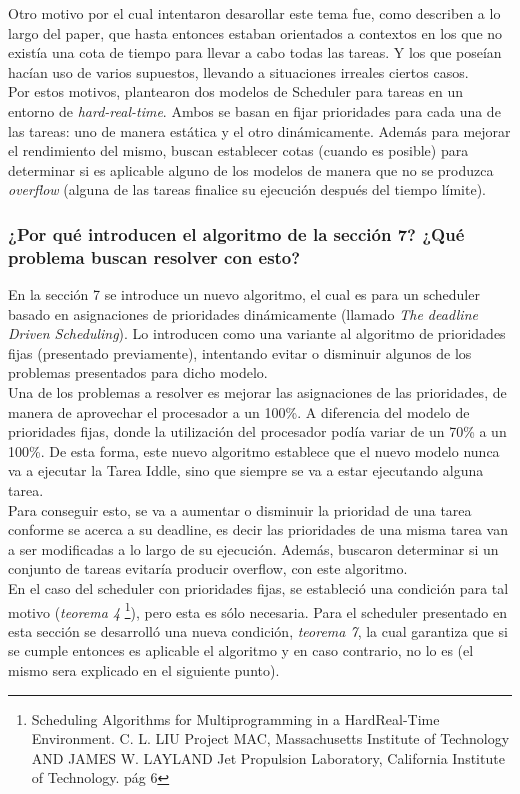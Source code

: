 \documentclass[a4paper]{article}
\begin{document}
Otro motivo por el cual intentaron desarollar este tema fue, como describen a lo largo del paper, que hasta entonces estaban orientados a contextos en los que no exist\'ia una cota de tiempo para llevar a cabo todas las tareas. Y los que pose\'ian hacían uso de varios supuestos, llevando a situaciones irreales ciertos casos. \\

Por estos motivos, plantearon dos modelos de Scheduler para tareas en un entorno de \textit{hard-real-time}. Ambos se basan en fijar prioridades para cada una de las tareas: uno de manera estática y el otro dinámicamente. Además para mejorar el rendimiento del mismo, buscan establecer cotas (cuando es posible) para determinar si es aplicable alguno de los modelos de manera que no se produzca \textit{overflow} (alguna de las tareas finalice su ejecución después del tiempo límite).


\subsubsection{¿Por qu\'e introducen el algoritmo de la secci\'on 7? ¿Qu\'e problema buscan resolver con esto?}
En la sección 7 se introduce un nuevo algoritmo, el cual es para un scheduler basado en asignaciones de prioridades dinámicamente (llamado \textit{The deadline Driven Scheduling}). Lo introducen como una variante al algoritmo de prioridades fijas (presentado previamente), intentando evitar o disminuir algunos de los problemas presentados para dicho modelo. \\

Una de los problemas a resolver es mejorar las asignaciones de las prioridades, de manera de aprovechar el procesador a un 100\%. A diferencia del modelo de prioridades fijas, donde la utilización del procesador podía variar de un 70\% a un 100\%. De esta forma, este nuevo algoritmo establece que el nuevo modelo nunca va a ejecutar la Tarea Iddle, sino que siempre se va a estar ejecutando alguna tarea. \\

 Para conseguir esto, se va a aumentar o disminuir la prioridad de una tarea conforme se acerca a su deadline, es decir las prioridades de una misma tarea van a ser modificadas a lo largo de su ejecución. Además, buscaron determinar si un conjunto de tareas evitar\'ia producir overflow, con este algoritmo.\\
 
  En el caso del scheduler con prioridades fijas, se estableció una condición para tal motivo (\textit{teorema 4} \footnote{Scheduling Algorithms for Multiprogramming in a HardReal-Time Environment.
C. L. LIU Project MAC, Massachusetts Institute of Technology AND JAMES W. LAYLAND Jet Propulsion Laboratory, California Institute of Technology. pág 6}), pero esta es s\'olo necesaria. Para el scheduler presentado en esta sección se desarroll\'o una nueva condición, \textit{teorema 7}, la cual garantiza que si se cumple entonces es aplicable el algoritmo y en caso contrario, no lo es (el mismo sera explicado en el siguiente punto). \\
  
\end{document}
